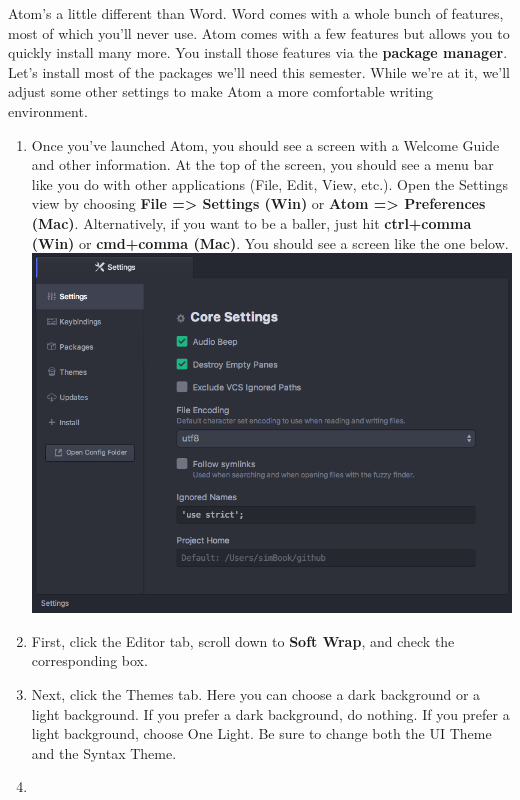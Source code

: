 \documentclass[]{book}
\providecommand{\tightlist}{%
  \setlength{\itemsep}{0pt}\setlength{\parskip}{0pt}}
\theoremstyle{definition}
\theoremstyle{definition}
\theoremstyle{definition}
\theoremstyle{remark}
\begin{document}
Atom's a little different than Word. Word comes with a whole bunch of
features, most of which you'll never use. Atom comes with a few features
but allows you to quickly install many more. You install those features
via the \textbf{package manager}. Let's install most of the packages
we'll need this semester. While we're at it, we'll adjust some other
settings to make Atom a more comfortable writing environment.

\begin{enumerate}
\def\labelenumi{\arabic{enumi}.}
\tightlist
\item
  Once you've launched Atom, you should see a screen with a Welcome
  Guide and other information. At the top of the screen, you should see
  a menu bar like you do with other applications (File, Edit, View,
  etc.). Open the Settings view by choosing \textbf{File =\textgreater{}
  Settings (Win)} or \textbf{Atom =\textgreater{} Preferences (Mac)}.
  Alternatively, if you want to be a baller, just hit \textbf{ctrl+comma
  (Win)} or \textbf{cmd+comma (Mac)}. You should see a screen like the
  one below.\\
  \includegraphics{atom-settings.png}
\item
  First, click the Editor tab, scroll down to \textbf{Soft Wrap}, and
  check the corresponding box.
\item
  Next, click the Themes tab. Here you can choose a dark background or a
  light background. If you prefer a dark background, do nothing. If you
  prefer a light background, choose One Light. Be sure to change both
  the UI Theme and the Syntax Theme.
\item

\end{enumerate}
\end{document}
